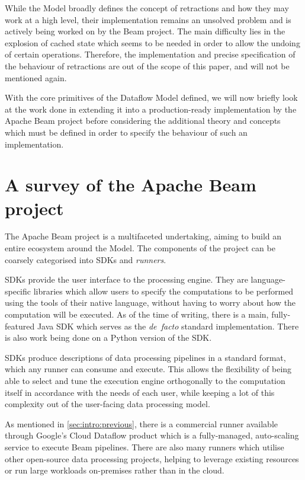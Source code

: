 
While the Model broadly defines the concept of retractions and how they may work at a high level, their implementation remains an unsolved problem and is actively being worked on by the Beam project.
The main difficulty lies in the explosion of cached state which seems to be needed in order to allow the undoing of certain operations.
Therefore, the implementation and precise specification of the behaviour of retractions are out of the scope of this paper, and will not be mentioned again.

With the core primitives of the Dataflow Model defined, we will now briefly look at the work done in extending it into a production-ready implementation by the Apache Beam project before considering the additional theory and concepts which must be defined in order to specify the behaviour of such an implementation.

\section{A survey of the Apache Beam project}\label{sec:prep:beam}

The Apache Beam project is a multifaceted undertaking, aiming to build an entire ecosystem around the Model.
The components of the project can be coarsely categorised into SDKs and \emph{runners}.

SDKs provide the user interface to the processing engine.
They are language-specific libraries which allow users to specify the computations to be performed using the tools of their native language, without having to worry about how the computation will be executed.
As of the time of writing, there is a main, fully-featured Java SDK which serves as the \emph{de~facto} standard implementation.
There is also work being done on a Python version of the SDK.

SDKs produce descriptions of data processing pipelines in a standard format, which any runner can consume and execute.
This allows the flexibility of being able to select and tune the execution engine orthogonally to the computation itself in accordance with the needs of each user, while keeping a lot of this complexity out of the user-facing data processing model.

As mentioned in \cref{sec:intro:previous}, there is a commercial runner available through Google's Cloud Dataflow product \cite{CloudDataflow} which is a fully-managed, auto-scaling service to execute Beam pipelines.
There are also many runners which utilise other open-source data processing projects, helping to leverage existing resources or run large workloads on-premises rather than in the cloud.

